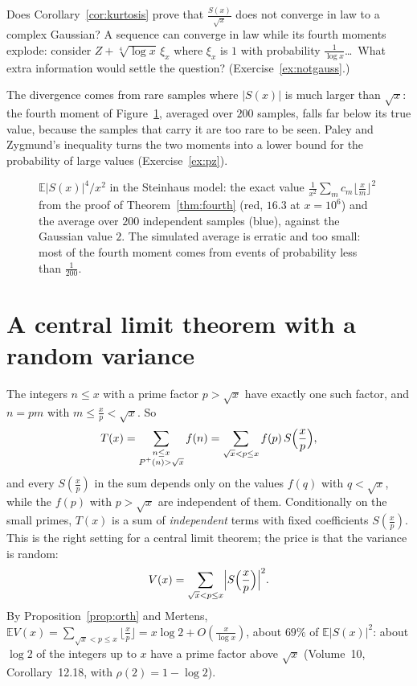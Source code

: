 \begin{think}
Does Corollary~\ref{cor:kurtosis} prove that $\frac{S(x)}{\sqrt x}$ does not converge in law to a complex Gaussian? A sequence can converge in law while its fourth moments explode: consider $Z+\sqrt[4]{\log x}\,\xi_x$ where $\xi_x$ is $1$ with probability $\frac1{\log x}$\ldots\ What extra information would settle the question? (Exercise~\ref{ex:notgauss}.)
\end{think}

The divergence comes from rare samples where $|S(x)|$ is much larger than $\sqrt x$: the fourth moment of Figure~\ref{fig:fourth}, averaged over $200$ samples, falls far below its true value, because the samples that carry it are too rare to be seen. Paley and Zygmund's inequality turns the two moments into a lower bound for the probability of large values (Exercise~\ref{ex:pz}).

\begin{figure}[ht]
\centering{}
\caption{$\mathbb E|S(x)|^4/x^2$ in the Steinhaus model: the exact value $\frac1{x^2}\sum_mc_m\lfloor\frac xm\rfloor^2$ from the proof of Theorem~\ref{thm:fourth} (red, $16.3$ at $x=10^6$) and the average over $200$ independent samples (blue), against the Gaussian value $2$. The simulated average is erratic and too small: most of the fourth moment comes from events of probability less than $\frac1{200}$.}
\label{fig:fourth}
\end{figure}

\section{A central limit theorem with a random variance}\label{sec:condclt}

The integers $n\le x$ with a prime factor $p>\sqrt x$ have exactly one such factor, and $n=pm$ with $m\le\frac xp<\sqrt x$. So
\begin{equation}\label{eq:largeprime}
T(x)=\sum_{\substack{n\le x\\P^+(n)>\sqrt x}}f(n)=\sum_{\sqrt x<p\le x}f(p)\,S\Bigl(\frac xp\Bigr),
\end{equation}
and every $S(\frac xp)$ in the sum depends only on the values $f(q)$ with $q<\sqrt x$, while the $f(p)$ with $p>\sqrt x$ are independent of them. Conditionally on the small primes, $T(x)$ is a sum of \emph{independent} terms with fixed coefficients $S(\frac xp)$. This is the right setting for a central limit theorem; the price is that the variance is random:
\[
V(x)=\sum_{\sqrt x<p\le x}\Bigl|S\Bigl(\frac xp\Bigr)\Bigr|^2.
\]
By Proposition~\ref{prop:orth} and Mertens, $\mathbb EV(x)=\sum_{\sqrt x<p\le x}\lfloor\frac xp\rfloor=x\log2+O(\frac x{\log x})$, about $69\%$ of $\mathbb E|S(x)|^2$: about $\log2$ of the integers up to $x$ have a prime factor above $\sqrt x$ (Volume~10, Corollary~12.18, with $\rho(2)=1-\log2$).


